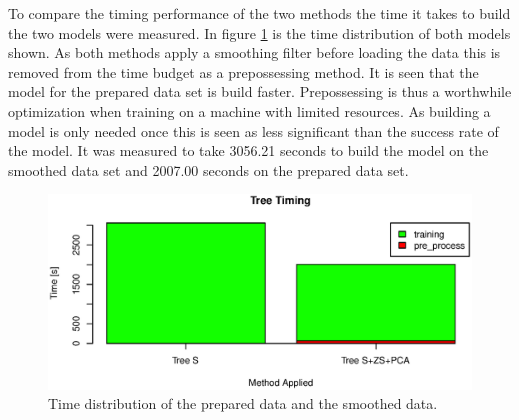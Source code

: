 To compare the timing performance of the two methods the time it takes to build the two models were measured.
In figure \ref{fig:tree_time_distribution} is the time distribution of both models shown.
As both methods apply a smoothing filter before loading the data this is removed from the time budget as a prepossessing method.
It is seen that the model for the prepared data set is build faster.
Prepossessing is thus a worthwhile optimization when training on a machine with limited resources.
As building a model is only needed once this is seen as less significant than the success rate of the model.
It was measured to take 3056.21 seconds to build the model on the smoothed data set and 2007.00 seconds on the prepared data set.

\begin{figure}[H]
\centering
\includegraphics[width=\textwidth]{graphics/algo_compare_timing_tree}
\caption{Time distribution of the prepared data and the smoothed data.}
\label{fig:tree_time_distribution}
\end{figure}